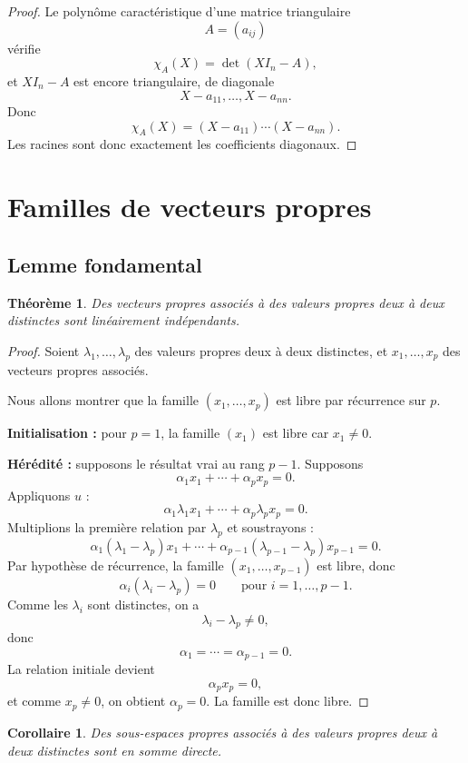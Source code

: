 \documentclass[11pt,a4paper]{article}
\newtheorem{theoreme}[definition]{Théorème}
\newtheorem{corollaire}[definition]{Corollaire}
\theoremstyle{remark}
\newcommand{\chiA}{\chi_A}
\begin{document}
\begin{proof}
Le polynôme caractéristique d’une matrice triangulaire
\[
A=(a_{ij})
\]
vérifie
\[
\chiA(X)=\det(XI_n-A),
\]
et \(XI_n-A\) est encore triangulaire, de diagonale
\[
X-a_{11},\dots,X-a_{nn}.
\]
Donc
\[
\chiA(X)=(X-a_{11})\cdots(X-a_{nn}).
\]
Les racines sont donc exactement les coefficients diagonaux.
\end{proof}

\section{Familles de vecteurs propres}

\subsection{Lemme fondamental}

\begin{theoreme}
Des vecteurs propres associés à des valeurs propres deux à deux distinctes sont linéairement indépendants.
\end{theoreme}

\begin{proof}
Soient \(\lambda_1,\dots,\lambda_p\) des valeurs propres deux à deux distinctes, et \(x_1,\dots,x_p\) des vecteurs propres associés.

Nous allons montrer que la famille \((x_1,\dots,x_p)\) est libre par récurrence sur \(p\).

\textbf{Initialisation :} pour \(p=1\), la famille \((x_1)\) est libre car \(x_1\neq 0\).

\textbf{Hérédité :} supposons le résultat vrai au rang \(p-1\). Supposons
\[
\alpha_1x_1+\cdots+\alpha_px_p=0.
\]
Appliquons \(u\) :
\[
\alpha_1\lambda_1x_1+\cdots+\alpha_p\lambda_px_p=0.
\]
Multiplions la première relation par \(\lambda_p\) et soustrayons :
\[
\alpha_1(\lambda_1-\lambda_p)x_1+\cdots+\alpha_{p-1}(\lambda_{p-1}-\lambda_p)x_{p-1}=0.
\]
Par hypothèse de récurrence, la famille \((x_1,\dots,x_{p-1})\) est libre, donc
\[
\alpha_i(\lambda_i-\lambda_p)=0
\qquad \text{pour } i=1,\dots,p-1.
\]
Comme les \(\lambda_i\) sont distinctes, on a
\[
\lambda_i-\lambda_p\neq 0,
\]
donc
\[
\alpha_1=\cdots=\alpha_{p-1}=0.
\]
La relation initiale devient
\[
\alpha_px_p=0,
\]
et comme \(x_p\neq 0\), on obtient \(\alpha_p=0\). La famille est donc libre.
\end{proof}

\begin{corollaire}
Des sous-espaces propres associés à des valeurs propres deux à deux distinctes sont en somme directe.
\end{corollaire}
\end{document}

